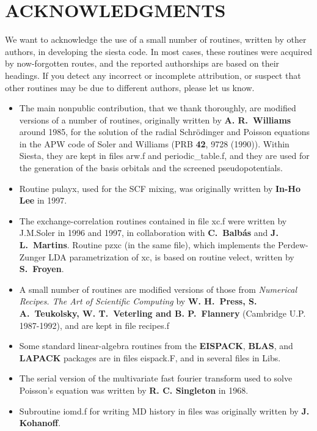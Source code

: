 \documentclass[11pt]{article}
\begin{document}
\section{ACKNOWLEDGMENTS}

We want to acknowledge the use of a small number of routines,
written by other authors, in developing the siesta code.
In most cases, these routines were acquired by now-forgotten
routes, and the reported authorships are based on their headings.
If you detect any incorrect or incomplete attribution, or suspect
that other routines may be due to different authors, please
let us know.

\begin{itemize}
\item
The main nonpublic contribution, that we thank thoroughly, are
modified versions of a number of routines, originally written by {\bf
  A. R.\ Williams} around 1985, for the solution of the radial
Schr\"odinger and Poisson equations in the APW code of Soler and
Williams (PRB {\bf 42}, 9728 (1990)).  Within {\sc Siesta}, they are
kept in files arw.f and periodic\_table.f, and they are used for the
generation of the basis orbitals and the screened pseudopotentials.

\item
Routine pulayx, used for the SCF mixing, was originally written by
{\bf In-Ho Lee} in 1997.

\item
The exchange-correlation routines contained in file xc.f were written
by J.M.Soler in 1996 and 1997, in collaboration with {\bf
  C.\ Balb\'as} and {\bf J. L.\ Martins}.  Routine pzxc (in the same
file), which implements the Perdew-Zunger LDA parametrization of xc,
is based on routine velect, written by {\bf S.\ Froyen}.

\item
A small number of routines are modified versions of those from {\em
  Numerical Recipes. The Art of Scientific Computing} by {\bf
  W. H.\ Press, S. A.\ Teukolsky, W. T.\ Veterling and
  B. P.\ Flannery} (Cambridge U.P. 1987-1992), and are kept in file
recipes.f

\item
Some standard linear-algebra routines from the {\bf EISPACK}, {\bf
  BLAS}, and {\bf LAPACK}  packages are in files eispack.F, and in
several files in Libs.

\item
The serial version of the multivariate fast fourier transform used to
solve Poisson's equation was written by {\bf R. C. Singleton} in 1968.

\item
Subroutine iomd.f for writing MD history in files was originally
written by {\bf J. Kohanoff}.
\end{itemize}
\end{document}
